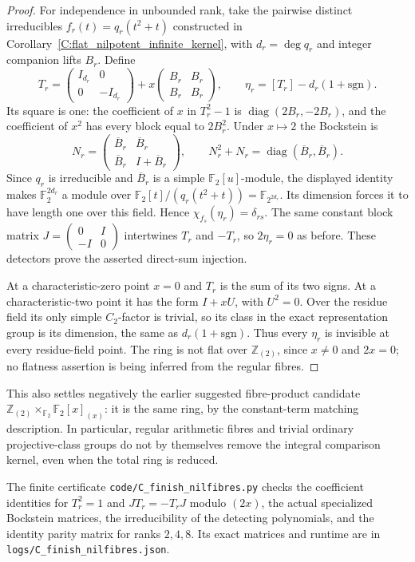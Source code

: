 \begin{proof}
For independence in unbounded rank, take the pairwise distinct
irreducibles $f_r(t)=q_r(t^2+t)$ constructed in
Corollary~\ref{C:flat_nilpotent_infinite_kernel}, with
$d_r=\deg q_r$ and integer companion lifts $B_r$. Define
\[
 T_r=\begin{pmatrix}I_{d_r}&0\\0&-I_{d_r}\end{pmatrix}
   +x\begin{pmatrix}B_r&B_r\\B_r&B_r\end{pmatrix},
 \qquad\eta_r=[T_r]-d_r(1+\mathrm{sgn}).               \tag{C.1.20}
\]
Its square is one: the coefficient of $x$ in $T_r^2-1$ is
$\operatorname{diag}(2B_r,-2B_r)$, and the coefficient of $x^2$
has every block equal to $2B_r^2$. Under $x\mapsto2$ the
Bockstein is
\[
 N_r=\begin{pmatrix}\overline B_r&\overline B_r\\
                  \overline B_r&I+\overline B_r\end{pmatrix},
 \qquad N_r^2+N_r=\operatorname{diag}(\overline B_r,
                                     \overline B_r).
\]
Since $q_r$ is irreducible and $\overline B_r$ is a simple
$\mathbb F_2[u]$-module, the displayed identity makes
$\mathbb F_2^{2d_r}$ a module over
$\mathbb F_2[t]/(q_r(t^2+t))=\mathbb F_{2^{2d_r}}$.
Its dimension forces it to have length one over this field.
Hence $\chi_{f_s}(\eta_r)=\delta_{rs}$.
The same constant block matrix
$J=\left(\begin{smallmatrix}0&I\\-I&0\end{smallmatrix}\right)$
intertwines $T_r$ and $-T_r$, so $2\eta_r=0$ as before.
These detectors prove the asserted direct-sum injection.

At a characteristic-zero point $x=0$ and $T_r$ is the sum of
its two signs. At a characteristic-two point it has the form
$I+xU$, with $U^2=0$. Over the residue field its only simple
$C_2$-factor is trivial, so its class in the exact representation
group is its dimension, the same as $d_r(1+\mathrm{sgn})$.
Thus every $\eta_r$ is invisible at every residue-field point.
The ring is not flat over $\mathbb Z_{(2)}$, since $x\ne0$
and $2x=0$; no flatness assertion is being inferred from the
regular fibres.
\end{proof}

This also settles negatively the earlier suggested fibre-product
candidate
$\mathbb Z_{(2)}\times_{\mathbb F_2}\mathbb F_2[x]_{(x)}$:
it is the same ring, by the constant-term matching description.
In particular, regular arithmetic fibres and trivial ordinary
projective-class groups do not by themselves remove the integral
comparison kernel, even when the total ring is reduced.

The finite certificate \texttt{code/C\_finish\_nilfibres.py}
checks the coefficient identities for $T_r^2=1$ and
$J T_r=-T_r J$ modulo $(2x)$, the actual specialized
Bockstein matrices, the irreducibility of the detecting polynomials,
and the identity parity matrix for ranks $2,4,8$.
Its exact matrices and runtime are in
\texttt{logs/C\_finish\_nilfibres.json}.
